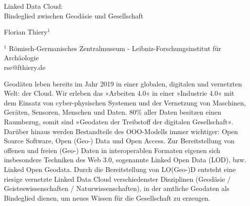 \documentclass[a4paper]{article}
\begin{document}

\Large
 \begin{center}
Linked Data Cloud:\\Bindeglied zwischen Geod{\"a}sie und Gesellschaft\\ 

\hspace{10pt}

\large
Florian Thiery$^1$\\

\hspace{10pt}

\small  
$^1$ R{\"o}misch-Germanisches Zentralmuseum - Leibniz-Forschungsinstitut f{\"u}r Arch{\"a}ologie\\
rse@fthiery.de\\

\end{center}

\normalsize

Geod{\"a}ten leben bereits im Jahr 2019 in einer globalen, digitalen und vernetzten Welt: der Cloud. Wir erleben das »Arbeiten 4.0« in einer »Industrie 4.0« mit dem Einsatz von cyber-physischen Systemen und der Vernetzung von Maschinen, Ger{\"a}ten, Sensoren, Menschen und Daten. 80\% aller Daten besitzen einen Raumbezug, somit sind  »Geodaten der Treibstoff der digitalen Gesellschaft«. Dar{\"u}ber hinaus werden Bestandteile des OOO-Modells\cite{ooo} immer wichtiger: Open Source Software, Open (Geo-) Data und Open Access. Zur Bereitstellung von offenen und freien (Geo-) Daten in interoperablen Formaten eigenen sich insbesondere Techniken des Web 3.0, sogenannte Linked Open Data\cite{tim_linked_2006} (LOD), bzw. Linked Open Geodata\cite{florian_thiery_2018_1421690}. Durch die Bereitstellung von LO(Geo-)D entsteht eine riesige vernetzte Linked Data Cloud\cite{lodcloud} verschiedenster Disziplinen (Geod{\"a}sie / Geisteswissenschaften / Naturwissenschaften), in der amtliche Geodaten als Bindeglied dienen, um neues Wissen f{\"u}r die Gesellschaft zu erzeugen\cite{florian_thiery_2019_2620929}.



\end{document}
